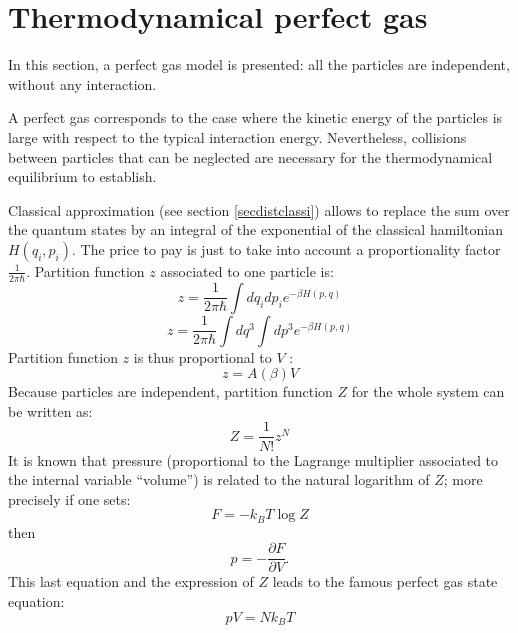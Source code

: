 \documentclass[12pt]{book}
\begin{document}
\section{Thermodynamical perfect gas}\label{secgasparfthe}
In this section, a perfect gas model is presented: all the particles are
independent, without any interaction.
\begin{rem}
A perfect gas corresponds to the case where the kinetic energy of the particles
is large with respect to the typical interaction energy. Nevertheless,
collisions between particles that can be neglected are necessary for the
thermodynamical equilibrium to establish.
\end{rem}
Classical approximation (see section \ref{secdistclassi}) allows to replace
the sum over the quantum states by an integral of the exponential of the
classical hamiltonian $H(q_i,p_i)$. The price to pay is just to take into
account a proportionality factor $\frac{1}{2\pi \hbar}$. Partition function
$z$ associated to one particle is:
\begin{equation}
z=\frac{1}{2\pi \hbar}\int dq_i dp_i e^{-\beta H(p,q)}
\end{equation}
\begin{equation}
z=\frac{1}{2\pi \hbar}\int dq^3 \int dp^3 e^{-\beta H(p,q)}
\end{equation}
Partition function $z$ is thus proportional to $V$ :
\begin{equation}
z=A(\beta) V
\end{equation}
Because particles are independent, partition function $Z$ for the whole system
can be written as:
\begin{equation}
Z=\frac{1}{N!}z^N
\end{equation}
It is known that pressure (proportional to the Lagrange multiplier associated
to the internal variable ``volume'') is related to the natural logarithm of
$Z$; more precisely if one sets:
\begin{equation}
F=-k_BT\log Z
\end{equation}
then
\begin{equation}
p=-\frac{\partial F}{\partial V}.
\end{equation}
This last equation and the expression of $Z$ leads to the famous perfect gas
state equation:
\begin{equation}
pV=Nk_BT
\end{equation}
\end{document}
